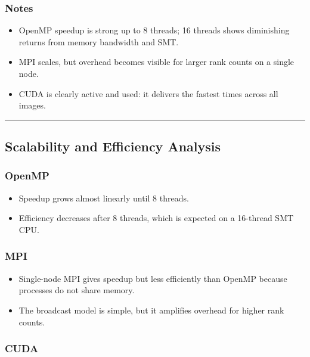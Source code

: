 \documentclass[
]{article}
\providecommand{\tightlist}{%
  \setlength{\itemsep}{0pt}\setlength{\parskip}{0pt}}
\begin{document}
\subsubsection{Notes}\label{notes}

\begin{itemize}
\tightlist
\item
  OpenMP speedup is strong up to 8 threads; 16 threads shows diminishing
  returns from memory bandwidth and SMT.
\item
  MPI scales, but overhead becomes visible for larger rank counts on a
  single node.
\item
  CUDA is clearly active and used: it delivers the fastest times across
  all images.
\end{itemize}

\begin{center}\rule{0.5\linewidth}{0.5pt}\end{center}

\subsection{Scalability and Efficiency
Analysis}\label{scalability-and-efficiency-analysis}

\subsubsection{OpenMP}\label{openmp}

\begin{itemize}
\tightlist
\item
  Speedup grows almost linearly until 8 threads.
\item
  Efficiency decreases after 8 threads, which is expected on a 16-thread
  SMT CPU.
\end{itemize}

\subsubsection{MPI}\label{mpi}

\begin{itemize}
\tightlist
\item
  Single-node MPI gives speedup but less efficiently than OpenMP because
  processes do not share memory.
\item
  The broadcast model is simple, but it amplifies overhead for higher
  rank counts.
\end{itemize}

\subsubsection{CUDA}\label{cuda}
\end{document}
